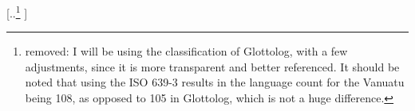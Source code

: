 \documentclass[unnumsec,webpdf,modern,medium]{oup-authoring-template}
\providecommand{\DIFdeltex}[1]{{\protect\color{red} [..\footnote{removed: #1} ]}} %
\providecommand{\DIFdelbegin}{} %
\providecommand{\DIFdelend}{} %
\providecommand{\DIFdel}[1]{\texorpdfstring{\DIFdeltex{#1}}{}} %
\newcommand{\DIFscaledelfig}{0.5}
\newlength{\DIFdelgraphicswidth} %
\newlength{\DIFdelgraphicsheight} %
\newcommand{\DIFdelincludegraphics}[2][]{%
\sbox{\DIFdelgraphicsbox}{\DIFOincludegraphics[#1]{#2}}%
\settoboxwidth{\DIFdelgraphicswidth}{\DIFdelgraphicsbox} %
\settoboxtotalheight{\DIFdelgraphicsheight}{\DIFdelgraphicsbox} %
\scalebox{\DIFscaledelfig}{%
\parbox[b]{\DIFdelgraphicswidth}{\usebox{\DIFdelgraphicsbox}\\[-\baselineskip] \rule{\DIFdelgraphicswidth}{0em}}\llap{\resizebox{\DIFdelgraphicswidth}{\DIFdelgraphicsheight}{%
\setlength{\unitlength}{\DIFdelgraphicswidth}%
\begin{picture}(1,1)%
\thicklines\linethickness{2pt} %
{\color[rgb]{1,0,0}\put(0,0){\framebox(1,1){}}}%
{\color[rgb]{1,0,0}\put(0,0){\line( 1,1){1}}}%
{\color[rgb]{1,0,0}\put(0,1){\line(1,-1){1}}}%
\end{picture}%
}\hspace*{3pt}}} %
} %
\DeclareRobustCommand{\DIFdelbegin}{\DIFOdelbegin \let\includegraphics\DIFdelincludegraphics} %
\DeclareRobustCommand{\DIFdelend}{\DIFOaddend \let\includegraphics\DIFOincludegraphics} %
\begin{document}
\DIFdelbegin \DIFdel{I will be using the classification of Glottolog, with a few adjustments, since it is more transparent and better referenced.
It should be noted that using the ISO 639-3 results in the language count for the Vanuatu being 108, as opposed to 105 in Glottolog, which is not a huge difference. 
}\DIFdelend %
\end{document}
